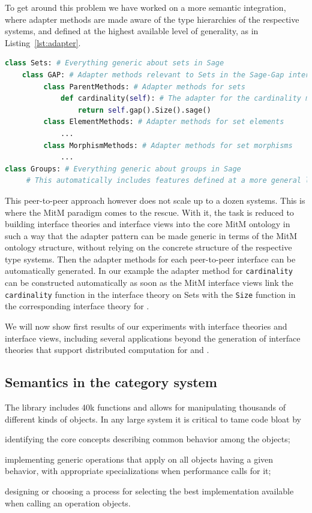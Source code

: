 To get around this problem we have worked on a more semantic
integration, where adapter methods are made aware of the type
hierarchies of the respective systems, and defined at the highest
available level of generality, as in Listing~\ref{lst:adapter}.
\begin{lstlisting}[language=Python,label=lst:adapter,
  caption=A semantic adapter method in \Sage]
class Sets: # Everything generic about sets in Sage
    class GAP: # Adapter methods relevant to Sets in the Sage-Gap interface
         class ParentMethods: # Adapter methods for sets
             def cardinality(self): # The adapter for the cardinality method
                 return self.gap().Size().sage()
         class ElementMethods: # Adapter methods for set elements
             ...
         class MorphismMethods: # Adapter methods for set morphisms
             ...
class Groups: # Everything generic about groups in Sage
     # This automatically includes features defined at a more general level
\end{lstlisting}

This peer-to-peer approach however does not scale up to a dozen
systems. This is where the MitM paradigm comes to the rescue. With it,
the task is reduced to building interface theories and interface views
into the core MitM ontology in such a way that the adapter pattern can be
made generic in terms of the MitM ontology structure, without relying
on the concrete structure of the respective type systems. Then the
adapter methods for each peer-to-peer interface can be automatically
generated.
%
In our example the adapter method for \texttt{cardinality} can be
constructed automatically as soon as the MitM interface views link the
\texttt{cardinality} function in the \Sage interface theory on Sets
with the \texttt{Size} function in the corresponding interface theory
for \GAP.

We will now show first results of our experiments with interface
theories and interface views, including several applications beyond the
generation of interface theories that support distributed computation
for \Sage and \GAP.

\subsection{Semantics in the \Sage category system}

The \Sage library includes 40k functions and allows for manipulating
thousands of different kinds of objects. In any large system it is
critical to tame code bloat by
\begin{compactenum}[\em i\rm)]
\item identifying the core concepts describing common behavior among the objects;
\item implementing generic operations that apply on all objects having a given
  behavior, with appropriate specializations when performance calls for it;
\item designing or choosing a process for selecting the best implementation available when
  calling an operation objects.
\end{compactenum}


